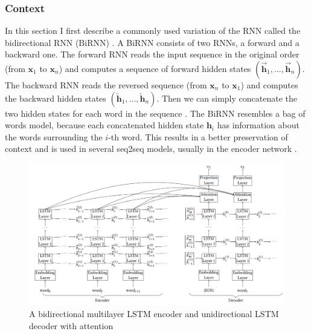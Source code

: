 \documentclass[12pt]{article}
\begin{document}
\subsubsection{Context} \label{sssec:context}
In this section I first describe a commonly used variation of the RNN called the bidirectional RNN (BiRNN) \cite{Schuster:1997}. A BiRNN consists of two RNNs, a forward and a backward one. The forward RNN reads the input sequence in the original order (from \(\bm{x}_1\) to \(\bm{x}_n\)) and computes a sequence of forward hidden states \((\overrightarrow{\bm{h}}_1,...,\overrightarrow{\bm{h}}_n)\). The backward RNN reads the reversed sequence (from \(\bm{x}_n\) to \(\bm{x}_1\)) and computes the backward hidden states \((\overleftarrow{\bm{h}}_1,...,\overleftarrow{\bm{h}}_n)\). Then we can simply concatenate the two hidden states for each word in the sequence \cite{Bahdanau:2014,Zhaob:2017}. The BiRNN resembles a bag of words model, because each concatenated hidden state \(\bm{h}_i\) has information about the words surrounding the \(i\)-th word. This results in a better preservation of context and is used in several seq2seq models, usually in the encoder network \cite{Zhaob:2017,Xing_topic:2017,googleNMT:2016,Yin:2017}.
\begin{figure}[H]
	\label{fig:context}
	\centering
	\includegraphics[width=1.0\textwidth]{pics/bilstm.png}
	\caption{A bidirectional multilayer LSTM encoder and unidirectional LSTM decoder with attention \cite{Yin:2017}}
\end{figure}
\end{document}
